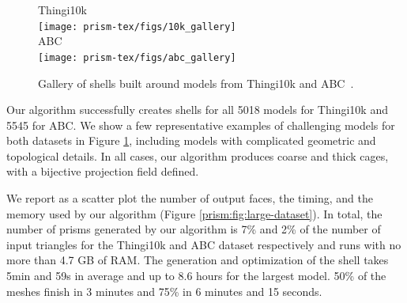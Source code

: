
\begin{figure}
    \centering
    Thingi10k\\
    \texttt{[image: prism-tex/figs/10k\_gallery]}\\%
    ABC\\
    \texttt{[image: prism-tex/figs/abc\_gallery]}
    \caption{Gallery of shells built around models from Thingi10k \protect\cite{zhou2016thingi10k} and ABC~\protect\cite{koch2019abc}.}
    \label{prism:fig:gallery}
    
\end{figure}


Our algorithm successfully creates shells for all 5018 models for Thingi10k and 5545 for ABC. 
We show a few representative examples of challenging models for both datasets in Figure \ref{prism:fig:gallery}, including models with complicated geometric and topological details. In all cases, our algorithm produces coarse and thick cages, with a bijective projection field defined.

We report as a scatter plot the number of output faces, the timing, and the memory used by our algorithm (Figure \ref{prism:fig:large-dataset}).
In total, the number of prisms generated by our algorithm is 7\% and 2\% of the number of input triangles for the Thingi10k and ABC dataset respectively 
and runs with no more than 4.7 {GB} of RAM. 
The generation and optimization of the shell takes 5min and 59s in average and up to 8.6 hours for the largest model. {50\% of the meshes finish in 3 minutes and 75\% in 6 minutes and 15 seconds.}

